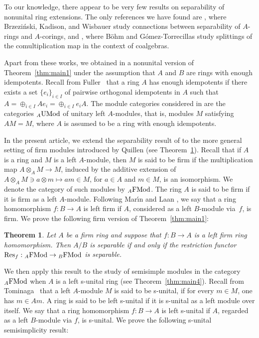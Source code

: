 \documentclass[12pt]{amsart}
\newtheorem{thm}{Theorem}
\theoremstyle{definition}
\newcommand{\FMod}{{\rm FMod}}
\newcommand{\UMod}{{\rm UMod}}
\newcommand{\Res}{{\rm Res}}
\begin{document}
To our knowledge, there appear to be very few results on 
separability of nonunital ring extensions. 
The only references we have found are 
\cite{brzezinski2005}, where Brzeziński, Kadison, and Wisbauer 
study connections between separability of 
\(A\)-rings and \(A\)-corings, 
and \cite{bohm2013}, where 
Böhm and Gómez-Torrecillas 
study splittings of the comultiplication map 
in the context of coalgebras.

Apart from these works, we obtained in 
\cite[Proposition~26]{CLP} a nonunital version of 
Theorem~\ref{thm:main1}
under the assumption that
\(A\) and \(B\) are rings with 
enough idempotents.
Recall from Fuller~\cite{fuller1976} that 
a ring \(A\)
has enough idem\-potents if there exists a 
set \(\{e_i\}_{i\in I}\) of 
pairwise orthogonal idempotents in \(A\)
such that
\(A=\oplus_{i\in I}Ae_i=\oplus_{i\in I}e_iA\).
The module categories considered in 
\cite{CLP}
are the categories \({}_A\UMod\) of 
unitary
left \(A\)-modules, that is, modules 
\(M\) satisfying \(AM=M\), 
where \(A\) is assumed to be a ring 
with enough idempotents.

In the present article, we extend the 
separability result of \cite{CLP}
to the more general setting of 
firm modules introduced by Quillen \cite{quillen1997} 
(see Theorem~\ref{thm:main3}).
Recall that if \(A\) is a ring and \(M\) is a 
left \(A\)-module, then \(M\) is said to 
be firm if the multiplication map
$A \otimes_A M \to M$, induced by the
additive extension of
$A \otimes_A M \ni a \otimes m \mapsto am \in M$,
for $a \in A$ and $m \in M$,
is an isomorphism.
We denote the category of such modules by 
\({}_A \FMod\).
The ring $A$ is said to be firm if it is 
firm as a left $A$-module.
Following Mar{\'\i}n and Laan \cite{marin2023},
we say that a ring homomorphism 
\(f : B \to A\) is left firm if \(A\), 
considered as a left \(B\)-module via~\(f\), 
is firm.
We prove the following firm version of 
Theorem~\ref{thm:main1}:

\begin{thm}\label{thm:main3}
Let $A$ be a firm ring and suppose that
\(f : B \to A\) is a left firm 
ring homomorphism. Then \(A/B\) is
separable if and only if the 
restriction functor
\(\Res_f : {}_A \FMod \to {}_B \FMod\) 
is separable.
\end{thm}

We then apply this result to the study of
semisimple modules in the category 
${}_A \FMod$
when $A$ is a left s-unital ring
(see Theorem~\ref{thm:main4}).
Recall from Tominaga~\cite{tominaga1976}
that a left $A$-module $M$ is 
said to be s-unital, if
for every $m \in M$, one has $m \in Am$.
A ring is said to be left s-unital if it is s-unital
as a left module over itself. 
We say that a ring homomorphism $f : B \to A$ is
left s-unital if $A$, regarded as a left $B$-module via $f$,
is s-unital.
We prove the following s-unital
semisimplicity result:
\end{document}
